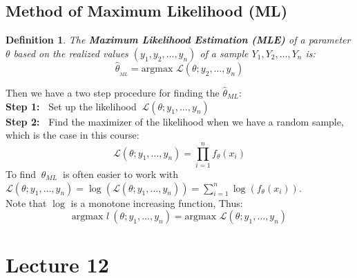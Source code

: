 \documentclass[14pt,twoside,a4paper,fleqn]{article}
\theoremstyle{plain}
\newtheorem*{definition*}{Definition}
\begin{document}
\subsection{Method of Maximum Likelihood (ML)}
\begin{definition*}
The \textbf{Maximum Likelihood Estimation (MLE)} of a parameter $\theta$ based on the realized values \mbox{$(y_1,y_2,\ldots,y_n)$} of a sample \mbox{$Y_1,Y_2,\ldots,Y_n$} is:
$$
	\hat{\theta}_{_{ML}} = \text{argmax\ }\mathscr{L}(\theta ; y_2,\ldots,y_n)
$$
\end{definition*}
Then we have a two step procedure for finding the $\hat{\theta}_{ML}$:\\
\textbf{Step 1:\ } Set up the likelihood $\ \mathscr{L}(\theta ; y_1,\ldots, y_n)\ $\\
\textbf{Step 2:\ } Find the maximizer of the likelihood when we have a random sample, which is the case in this course:
$$
	\mathscr{L}(\theta ; y_1,\ldots,y_n) = \prod\limits_{i=1}^n f_{\theta}(x_i)
$$
To find $\ \hat{\theta}_{ML}\ $ is often easier to work with \mbox{\ $\mathscr{L}(\theta ; y_1,\ldots,y_n) = \log(\mathscr{L}(\theta;y_1,\ldots,y_n))=\sum\limits_{i=1}^n \log(f_{\theta}(x_i))$}.\\
Note that $\log$ is a monotone increasing function, Thus:
$$
	\text{argmax } l\ (\theta ; y_1,\ldots,y_n) = \text{argmax }\mathscr{L}(\theta ; y_1,\ldots, y_n)
$$


































\newpage
\section{Lecture 12}
\end{document}

